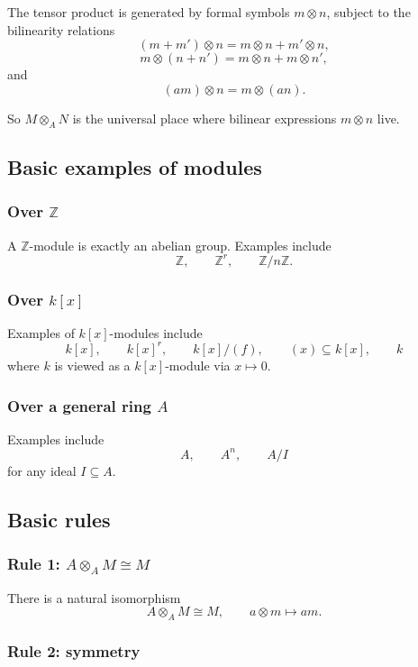 \documentclass[12pt,a4paper]{article}
\theoremstyle{notespace}
\begin{document}
The tensor product is generated by formal symbols \(m\otimes n\), subject to the bilinearity relations
\[
(m+m')\otimes n = m\otimes n + m'\otimes n,
\]
\[
m\otimes (n+n') = m\otimes n + m\otimes n',
\]
and
\[
(am)\otimes n = m\otimes (an).
\]

So \(M\otimes_A N\) is the universal place where bilinear expressions \(m\otimes n\) live.

\subsection{Basic examples of modules}

\subsubsection*{Over \(\mathbb Z\)}

A \(\mathbb Z\)-module is exactly an abelian group. Examples include
\[
\mathbb Z,\qquad \mathbb Z^r,\qquad \mathbb Z/n\mathbb Z.
\]

\subsubsection*{Over \(k[x]\)}

Examples of \(k[x]\)-modules include
\[
k[x],\qquad k[x]^r,\qquad k[x]/(f),\qquad (x)\subseteq k[x],\qquad k
\]
where \(k\) is viewed as a \(k[x]\)-module via \(x\mapsto 0\).

\subsubsection*{Over a general ring \(A\)}

Examples include
\[
A,\qquad A^n,\qquad A/I
\]
for any ideal \(I\subseteq A\).

\subsection{Basic rules}

\subsubsection*{Rule 1: \(A\otimes_A M\cong M\)}

There is a natural isomorphism
\[
A\otimes_A M\cong M,
\qquad
a\otimes m \mapsto am.
\]

\subsubsection*{Rule 2: symmetry}
\end{document}
